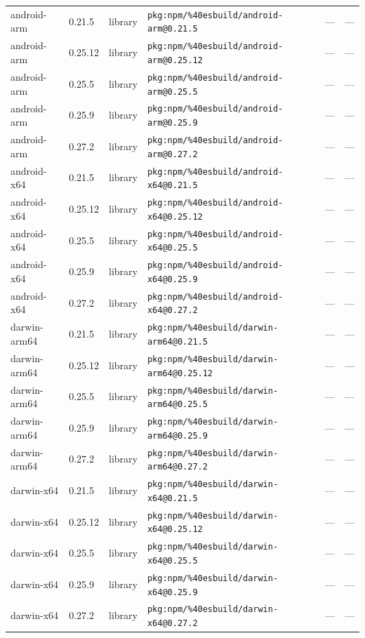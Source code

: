 \documentclass[11pt]{article}
\begin{document}
\begin{longtable}{|l|l|l|p{2.2cm}|l|p{4cm}|}
android-arm & 0.21.5 & library & \texttt{pkg:npm/\%40esbuild/android-arm@0.21.5} & — & — \\
android-arm & 0.25.12 & library & \texttt{pkg:npm/\%40esbuild/android-arm@0.25.12} & — & — \\
android-arm & 0.25.5 & library & \texttt{pkg:npm/\%40esbuild/android-arm@0.25.5} & — & — \\
android-arm & 0.25.9 & library & \texttt{pkg:npm/\%40esbuild/android-arm@0.25.9} & — & — \\
android-arm & 0.27.2 & library & \texttt{pkg:npm/\%40esbuild/android-arm@0.27.2} & — & — \\
android-x64 & 0.21.5 & library & \texttt{pkg:npm/\%40esbuild/android-x64@0.21.5} & — & — \\
android-x64 & 0.25.12 & library & \texttt{pkg:npm/\%40esbuild/android-x64@0.25.12} & — & — \\
android-x64 & 0.25.5 & library & \texttt{pkg:npm/\%40esbuild/android-x64@0.25.5} & — & — \\
android-x64 & 0.25.9 & library & \texttt{pkg:npm/\%40esbuild/android-x64@0.25.9} & — & — \\
android-x64 & 0.27.2 & library & \texttt{pkg:npm/\%40esbuild/android-x64@0.27.2} & — & — \\
darwin-arm64 & 0.21.5 & library & \texttt{pkg:npm/\%40esbuild/darwin-arm64@0.21.5} & — & — \\
darwin-arm64 & 0.25.12 & library & \texttt{pkg:npm/\%40esbuild/darwin-arm64@0.25.12} & — & — \\
darwin-arm64 & 0.25.5 & library & \texttt{pkg:npm/\%40esbuild/darwin-arm64@0.25.5} & — & — \\
darwin-arm64 & 0.25.9 & library & \texttt{pkg:npm/\%40esbuild/darwin-arm64@0.25.9} & — & — \\
darwin-arm64 & 0.27.2 & library & \texttt{pkg:npm/\%40esbuild/darwin-arm64@0.27.2} & — & — \\
darwin-x64 & 0.21.5 & library & \texttt{pkg:npm/\%40esbuild/darwin-x64@0.21.5} & — & — \\
darwin-x64 & 0.25.12 & library & \texttt{pkg:npm/\%40esbuild/darwin-x64@0.25.12} & — & — \\
darwin-x64 & 0.25.5 & library & \texttt{pkg:npm/\%40esbuild/darwin-x64@0.25.5} & — & — \\
darwin-x64 & 0.25.9 & library & \texttt{pkg:npm/\%40esbuild/darwin-x64@0.25.9} & — & — \\
darwin-x64 & 0.27.2 & library & \texttt{pkg:npm/\%40esbuild/darwin-x64@0.27.2} & — & — \\

\end{longtable}
\end{document}
